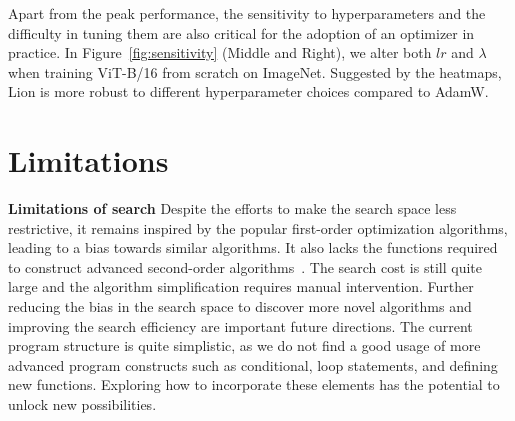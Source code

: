 \documentclass{article}
\newcommand{\name}{Lion}
\begin{document}
Apart from the peak performance, the sensitivity to hyperparameters and the difficulty in tuning them are also critical for the adoption of an optimizer in practice.
In Figure~\ref{fig:sensitivity} (Middle and Right), we alter both $lr$ and $\lambda$ when training ViT-B/16 from scratch on ImageNet.
Suggested by the heatmaps, \name{} is more robust to different hyperparameter choices compared to AdamW.






\section{Limitations}
\label{sec:limit}

\textbf{Limitations of search}
Despite the efforts to make the search space less restrictive, it remains inspired by the popular first-order optimization algorithms, leading to a bias towards similar algorithms.
It also lacks the functions required to construct advanced second-order algorithms~\citep{anil2020second,gupta2018shampoo,martens2015optimizing}. 
The search cost is still quite large and the algorithm simplification requires manual intervention. 
Further reducing the bias in the search space to discover more novel algorithms and improving the search efficiency are important future directions. 
The current program structure is quite simplistic, as we do not find a good usage of more advanced program constructs such as conditional, loop statements, and defining new functions. 
Exploring how to incorporate these elements has the potential to unlock new possibilities.
\end{document}
